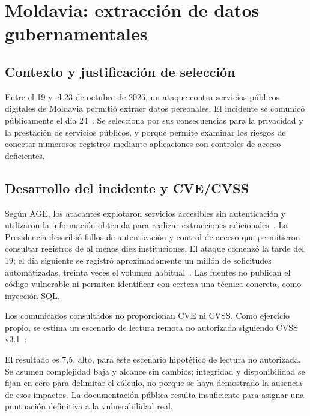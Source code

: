 \chapter{Moldavia: extracción de datos gubernamentales}
\label{chap:incidente3}

\section{Contexto y justificación de selección}
Entre el 19 y el 23 de octubre de 2026, un ataque contra servicios públicos digitales de Moldavia permitió extraer datos personales. El incidente se comunicó públicamente el día 24~\cite{age2026inicial,age2026datos}. Se selecciona por sus consecuencias para la privacidad y la prestación de servicios públicos, y porque permite examinar los riesgos de conectar numerosos registros mediante aplicaciones con controles de acceso deficientes.

\section{Desarrollo del incidente y CVE/CVSS}
Según AGE, los atacantes explotaron servicios accesibles
sin autenticación y utilizaron la información obtenida
para realizar extracciones adicionales~\cite{age2026datos}.
La Presidencia describió fallos de autenticación y control
de acceso que permitieron consultar registros de al menos
diez instituciones. El ataque comenzó la tarde del 19;
el día siguiente se registró aproximadamente un millón
de solicitudes automatizadas, treinta veces el volumen
habitual~\cite{presidencia2026moldavia}.
Las fuentes no publican el código vulnerable ni permiten
identificar con certeza una técnica concreta, como
inyección SQL.

Los comunicados consultados no proporcionan CVE ni CVSS.
Como ejercicio propio, se estima un escenario de lectura
remota no autorizada siguiendo CVSS v3.1~\cite{firstcvss31}:\par
{}\par
\noindent El resultado es 7,5, alto, para este escenario hipotético de lectura no autorizada. Se asumen complejidad baja y alcance sin cambios; integridad y disponibilidad se fijan en cero para delimitar el cálculo, no porque se haya demostrado la ausencia de esos impactos. La documentación pública resulta insuficiente para asignar una puntuación definitiva a la vulnerabilidad real.

